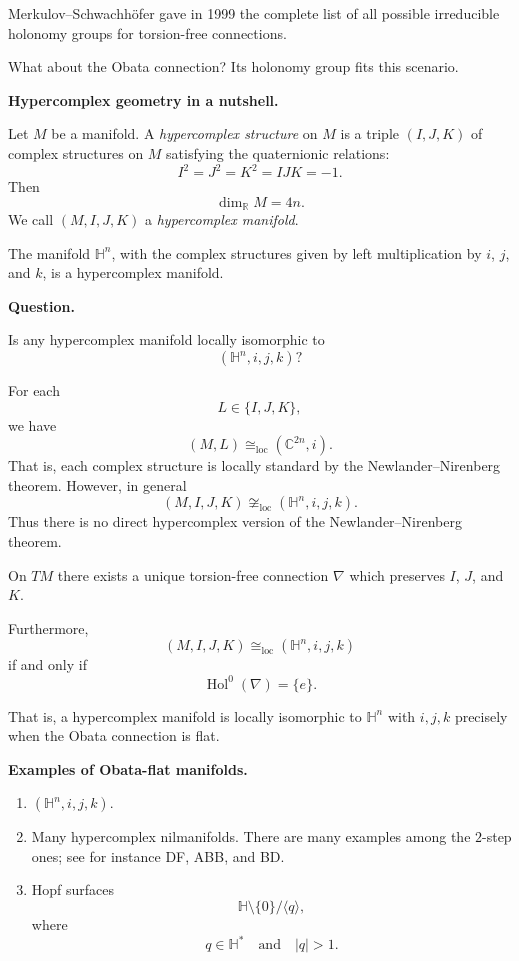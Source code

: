 Merkulov--Schwachh\"ofer gave in 1999
the complete list of all possible
irreducible holonomy groups for
torsion-free connections.

What about the Obata connection?
Its holonomy group fits this
scenario.

\medskip\noindent
{\bf Hypercomplex geometry in a
nutshell.}

Let $M$ be a manifold.
A {\it hypercomplex structure} on $M$
is a
triple $(I,J,K)$ of complex structures
on $M$ satisfying the quaternionic
relations:
\[
I^2=J^2=K^2=IJK=-1.
\]
Then
\[
\dim_{\mathbb{R}} M=4n.
\]
We call $(M,I,J,K)$ a {\it
hypercomplex manifold}.

\begin{example}
\label{example-manifold-n}
The manifold $\mathbb{H}^n$, with
the complex structures given by left
multiplication by $i$, $j$, and $k$,
is a hypercomplex manifold.
\end{example}

\medskip\noindent
{\bf Question.}

Is any hypercomplex manifold locally
isomorphic to
\[
(\mathbb{H}^n,i,j,k)?
\]

For each
\[
L\in\{I,J,K\},
\]
we have
\[
(M,L)\cong_{\mathrm{loc}}
(\mathbb{C}^{2n},i).
\]
That is, each complex structure is
locally standard by the
Newlander--Nirenberg theorem.
However, in general
\[
(M,I,J,K)\not\cong_{\mathrm{loc}}
(\mathbb{H}^n,i,j,k).
\]
Thus there is no direct
hypercomplex version of the
Newlander--Nirenberg theorem.


\begin{theorem}[Obata]
\label{theorem-tm-exists}
On $TM$ there exists a unique
torsion-free connection $\nabla$
which preserves $I$, $J$, and $K$.
\end{theorem}

Furthermore,
\[
(M,I,J,K)\cong_{\mathrm{loc}}
(\mathbb{H}^n,i,j,k)
\]
if and only if
\[
\operatorname{Hol}^0(\nabla)=\{e\}.
\]

That is, a hypercomplex manifold is locally
isomorphic to $\mathbb{H}^n$
with $i,j,k$ precisely when the
Obata connection is flat.

\medskip\noindent
{\bf Examples of Obata-flat
manifolds.}

\begin{enumerate}
\item
$(\mathbb{H}^n,i,j,k)$.
\item Many hypercomplex nilmanifolds.
There are many examples among the
$2$-step ones; see for instance
DF, ABB, and BD.
\item Hopf surfaces
\[
\mathbb{H}\setminus\{0\}/\langle q\rangle,
\]
where
\[
q\in\mathbb{H}^*
\quad\text{and}\quad
|q|>1.
\]
\end{enumerate}


